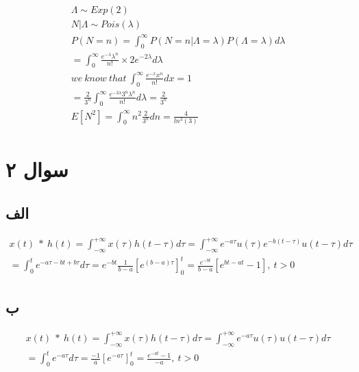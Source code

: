 \documentclass{article}[12pt]
\begin{document}
\begin{eqnarray*}
	\begin{gathered}
			\Lambda \sim Exp( 2)\\
			N|\Lambda \sim Pois( \lambda )\\
			P( N=n) =\int _{0}^{\infty } P( N=n|\Lambda =\lambda ) P( \Lambda =\lambda ) d\lambda \\
			=\int _{0}^{\infty }\frac{e^{-\lambda } \lambda ^{n}}{n!} \times 2e^{-2\lambda } d\lambda \\
			we\ know\ that\ \int _{0}^{\infty }\frac{e^{-x} x^{n}}{n!} dx=1\\
			=\frac{2}{3^{n}}\int _{0}^{\infty }\frac{e^{-3\lambda } 3^{n} \lambda ^{n}}{n!} d\lambda =\frac{2}{3^{n}}\\
			E\left[ N^{2}\right] =\int _{0}^{\infty } n^{2}\frac{2}{3^{n}} dn=\frac{4}{ln^{3}( 3)} 
	\end{gathered}
\end{eqnarray*}


\section{سوال ۲}
\subsection{الف}
\begin{equation}
	\begin{gathered}
			x( t) \ *\ h( t) =\int _{-\infty }^{+\infty } x( \tau ) h( t-\tau ) d\tau =\int _{-\infty }^{+\infty } e^{-a\tau } u( \tau ) e^{-b( t-\tau )} u( t-\tau ) d\tau \\
			=\int _{0}^{t} e^{-a\tau -bt+b\tau } d\tau =e^{-bt}\frac{1}{b-a}\left[ e^{( b-a) \tau }\right]_{0}^{t} =\frac{e^{-bt}}{b-a}\left[ e^{bt-at} -1\right] ,\ t >0
	\end{gathered}
\end{equation}
\subsection{ب}

\begin{equation}
	\begin{gathered}
			x( t) \ *\ h( t) =\int _{-\infty }^{+\infty } x( \tau ) h( t-\tau ) d\tau =\int _{-\infty }^{+\infty } e^{-a\tau } u( \tau ) u( t-\tau ) d\tau \\
			=\int _{0}^{t} e^{-a\tau } d\tau =\frac{-1}{a}\left[ e^{-a\tau }\right]_{0}^{t} =\frac{e^{-at} -1}{-a} ,\ t >0
	\end{gathered}
\end{equation}
\end{document}
